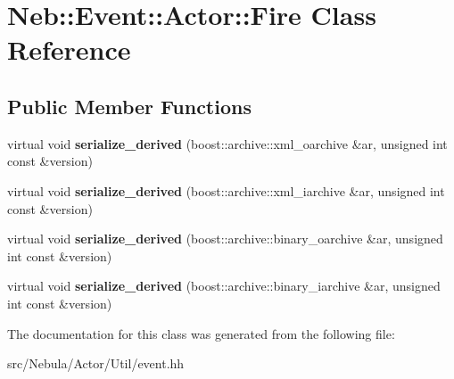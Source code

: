 \hypertarget{classNeb_1_1Event_1_1Actor_1_1Fire}{\section{\-Neb\-:\-:\-Event\-:\-:\-Actor\-:\-:\-Fire \-Class \-Reference}
\label{classNeb_1_1Event_1_1Actor_1_1Fire}
}
\subsection*{\-Public \-Member \-Functions}
\begin{DoxyCompactItemize}
\item 
\hypertarget{classNeb_1_1Event_1_1Actor_1_1Fire_aeeab712a8bc132bc4b119e05d47ba87d}{virtual void {\bfseries serialize\-\_\-derived} (boost\-::archive\-::xml\-\_\-oarchive \&ar, unsigned int const \&version)}\label{classNeb_1_1Event_1_1Actor_1_1Fire_aeeab712a8bc132bc4b119e05d47ba87d}

\item 
\hypertarget{classNeb_1_1Event_1_1Actor_1_1Fire_a2d0e2250cf3976238e8c4d623f0eea29}{virtual void {\bfseries serialize\-\_\-derived} (boost\-::archive\-::xml\-\_\-iarchive \&ar, unsigned int const \&version)}\label{classNeb_1_1Event_1_1Actor_1_1Fire_a2d0e2250cf3976238e8c4d623f0eea29}

\item 
\hypertarget{classNeb_1_1Event_1_1Actor_1_1Fire_aa09cae683af824389171eec336a054f7}{virtual void {\bfseries serialize\-\_\-derived} (boost\-::archive\-::binary\-\_\-oarchive \&ar, unsigned int const \&version)}\label{classNeb_1_1Event_1_1Actor_1_1Fire_aa09cae683af824389171eec336a054f7}

\item 
\hypertarget{classNeb_1_1Event_1_1Actor_1_1Fire_a026adc92ad9162573f5b0f87b4ac93bb}{virtual void {\bfseries serialize\-\_\-derived} (boost\-::archive\-::binary\-\_\-iarchive \&ar, unsigned int const \&version)}\label{classNeb_1_1Event_1_1Actor_1_1Fire_a026adc92ad9162573f5b0f87b4ac93bb}

\end{DoxyCompactItemize}


\-The documentation for this class was generated from the following file\-:\begin{DoxyCompactItemize}
\item 
src/\-Nebula/\-Actor/\-Util/event.\-hh\end{DoxyCompactItemize}
